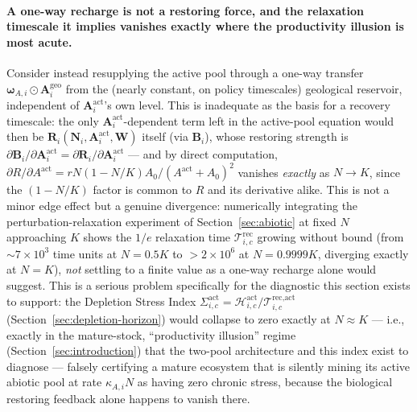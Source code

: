 \documentclass[twocolumn,10pt]{article}
\begin{document}
\paragraph{A one-way recharge is not a restoring force, and the relaxation timescale it implies vanishes exactly where the productivity illusion is most acute.} Consider instead resupplying the active pool through a one-way transfer $\boldsymbol\omega_{A,i}\odot\mathbf A^{\text{geo}}_i$ from the (nearly constant, on policy timescales) geological reservoir, independent of $\mathbf A^{\text{act}}_i$'s own level. This is inadequate as the basis for a recovery timescale: the only $\mathbf A^{\text{act}}_i$-dependent term left in the active-pool equation would then be $\mathbf R_i(\mathbf N_i,\mathbf A^{\text{act}}_i,\mathbf W)$ itself (via $\mathbf B_i$), whose restoring strength is $\partial \mathbf B_i/\partial \mathbf A^{\text{act}}_i=\partial\mathbf R_i/\partial\mathbf A^{\text{act}}_i$ — and by direct computation, $\partial R/\partial A^{\text{act}}=rN(1-N/K)A_0/(A^{\text{act}}+A_0)^2$ vanishes \emph{exactly} as $N\to K$, since the $(1-N/K)$ factor is common to $R$ and its derivative alike. This is not a minor edge effect but a genuine divergence: numerically integrating the perturbation-relaxation experiment of Section~\ref{sec:abiotic} at fixed $N$ approaching $K$ shows the $1/e$ relaxation time $\mathcal T^{\text{rec}}_{i,c}$ growing without bound (from $\sim7\times10^3$ time units at $N=0.5K$ to $>2\times10^6$ at $N=0.9999K$, diverging exactly at $N=K$), \emph{not} settling to a finite value as a one-way recharge alone would suggest. This is a serious problem specifically for the diagnostic this section exists to support: the Depletion Stress Index $\Sigma^{\text{act}}_{i,c}=\mathcal H^{\text{act}}_{i,c}/\mathcal T^{\text{rec},\text{act}}_{i,c}$ (Section~\ref{sec:depletion-horizon}) would collapse to zero exactly at $N\approx K$ — i.e., exactly in the mature-stock, ``productivity illusion'' regime (Section~\ref{sec:introduction}) that the two-pool architecture and this index exist to diagnose — falsely certifying a mature ecosystem that is silently mining its active abiotic pool at rate $\kappa_{A,i}N$ as having zero chronic stress, because the biological restoring feedback alone happens to vanish there.
\end{document}
